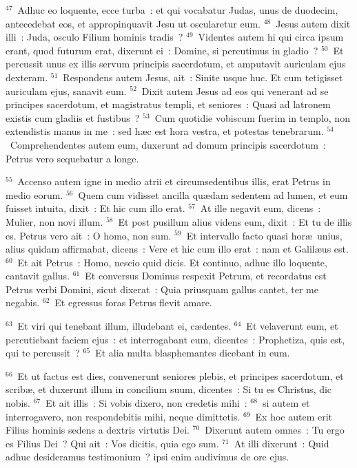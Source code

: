 ${}^{47}$~Adhuc eo loquente, ecce turba~: et qui vocabatur Judas, unus de duodecim, antecedebat eos, et appropinquavit Jesu ut oscularetur eum.
${}^{48}$~Jesus autem dixit illi~: Juda, osculo Filium hominis tradis~?
${}^{49}$~Videntes autem hi qui circa ipsum erant, quod futurum erat, dixerunt ei~: Domine, si percutimus in gladio~?
${}^{50}$~Et percussit unus ex illis servum principis sacerdotum, et amputavit auriculam ejus dexteram.
${}^{51}$~Respondens autem Jesus, ait~: Sinite usque huc. Et cum tetigisset auriculam ejus, sanavit eum.
${}^{52}$~Dixit autem Jesus ad eos qui venerant ad se principes sacerdotum, et magistratus templi, et seniores~: Quasi ad latronem existis cum gladiis et fustibus~?
${}^{53}$~Cum quotidie vobiscum fuerim in templo, non extendistis manus in me~: sed h\ae c est hora vestra, et potestas tenebrarum.
${}^{54}$~Comprehendentes autem eum, duxerunt ad domum principis sacerdotum~: Petrus vero sequebatur a longe.


${}^{55}$~Accenso autem igne in medio atrii et circumsedentibus illis, erat Petrus in medio eorum.
${}^{56}$~Quem cum vidisset ancilla qu\ae dam sedentem ad lumen, et eum fuisset intuita, dixit~: Et hic cum illo erat.
${}^{57}$~At ille negavit eum, dicens~: Mulier, non novi illum.
${}^{58}$~Et post pusillum alius videns eum, dixit~: Et tu de illis es. Petrus vero ait~: O homo, non sum.
${}^{59}$~Et intervallo facto quasi hor\ae\ unius, alius quidam affirmabat, dicens~: Vere et hic cum illo erat~: nam et Galil\ae us est.
${}^{60}$~Et ait Petrus~: Homo, nescio quid dicis. Et continuo, adhuc illo loquente, cantavit gallus.
${}^{61}$~Et conversus Dominus respexit Petrum, et recordatus est Petrus verbi Domini, sicut dixerat~: Quia priusquam gallus cantet, ter me negabis.
${}^{62}$~Et egressus foras Petrus flevit amare.


${}^{63}$~Et viri qui tenebant illum, illudebant ei, c\ae dentes.
${}^{64}$~Et velaverunt eum, et percutiebant faciem ejus~: et interrogabant eum, dicentes~: Prophetiza, quis est, qui te percussit~?
${}^{65}$~Et alia multa blasphemantes dicebant in eum.


${}^{66}$~Et ut factus est dies, convenerunt seniores plebis, et principes sacerdotum, et scrib\ae , et duxerunt illum in concilium suum, dicentes~: Si tu es Christus, dic nobis.
${}^{67}$~Et ait illis~: Si vobis dixero, non credetis mihi~:
${}^{68}$~si autem et interrogavero, non respondebitis mihi, neque dimittetis.
${}^{69}$~Ex hoc autem erit Filius hominis sedens a dextris virtutis Dei.
${}^{70}$~Dixerunt autem omnes~: Tu ergo es Filius Dei~? Qui ait~: Vos dicitis, quia ego sum.
${}^{71}$~At illi dixerunt~: Quid adhuc desideramus testimonium~? ipsi enim audivimus de ore ejus.

